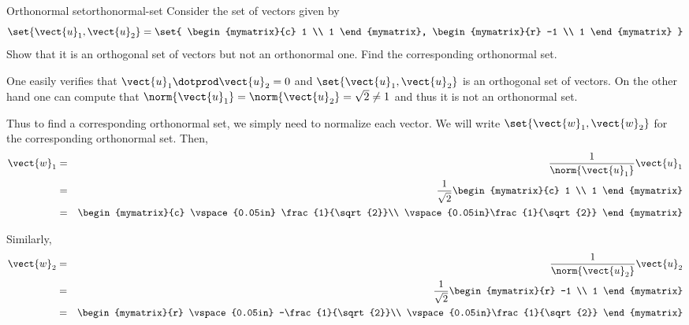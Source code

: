 \begin{example}{Orthonormal set}{orthonormal-set}
Consider the set of vectors  given by 
\[
\set{\vect{u}_1, \vect{u}_2 } = \set{
\begin{mymatrix}{c}
1 \\
1 
\end{mymatrix}, 
\begin{mymatrix}{r}
-1 \\
1
\end{mymatrix}
}
\]
Show that it is an orthogonal set of vectors  but not an orthonormal one. Find the corresponding orthonormal set. 
\end{example}

\begin{solution}
One easily verifies that $\vect{u}_1 \dotprod \vect{u}_2 = 0$ and
$\set{\vect{u}_1, \vect{u}_2 }$ is an orthogonal set of
vectors. On the other hand one can compute that $\norm{\vect{u}_1}= \norm{\vect{u}_2} =
\sqrt{2} \neq 1$ and thus it is not an orthonormal set.

Thus to find a corresponding orthonormal set, we simply need to
normalize each vector. We will write $\set{\vect{w}_1, \vect{w}_2}$
for the corresponding orthonormal set. Then,
\begin{eqnarray*}
\vect{w}_1 &=& \frac{1}{\norm{\vect{u}_1}} \vect{u}_1\\
&=& \frac{1}{\sqrt{2}} \begin{mymatrix}{c}
1 \\
1 
\end{mymatrix} \\
&=&
\begin{mymatrix}{c}
\vspace{0.05in} \frac{1}{\sqrt{2}}\\
\vspace{0.05in}\frac{1}{\sqrt{2}} 
\end{mymatrix}
\end{eqnarray*}

Similarly, 
\begin{eqnarray*}
\vect{w}_2 &=& \frac{1}{\norm{\vect{u}_2}} \vect{u}_2\\
&=& \frac{1}{\sqrt{2}} \begin{mymatrix}{r}
-1 \\
1 
\end{mymatrix} \\
&=&
\begin{mymatrix}{r}
\vspace{0.05in} -\frac{1}{\sqrt{2}}\\
\vspace{0.05in}\frac{1}{\sqrt{2}} 
\end{mymatrix}
\end{eqnarray*}


\end{solution}
